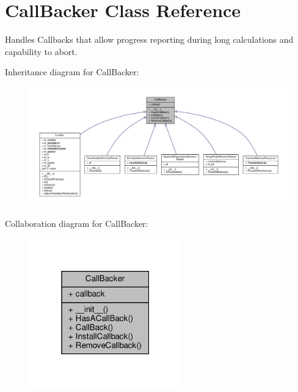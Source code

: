 \hypertarget{classSignalIntegrity_1_1CallBacker_1_1CallBacker}{}\section{Call\+Backer Class Reference}
\label{classSignalIntegrity_1_1CallBacker_1_1CallBacker}


Handles Callbacks that allow progress reporting during long calculations and capability to abort.  




Inheritance diagram for Call\+Backer\+:
\nopagebreak
\begin{figure}[H]
\begin{center}
\leavevmode
\includegraphics[width=350pt]{classSignalIntegrity_1_1CallBacker_1_1CallBacker__inherit__graph}
\end{center}
\end{figure}


Collaboration diagram for Call\+Backer\+:
\nopagebreak
\begin{figure}[H]
\begin{center}
\leavevmode
\includegraphics[width=187pt]{classSignalIntegrity_1_1CallBacker_1_1CallBacker__coll__graph}
\end{center}
\end{figure}
